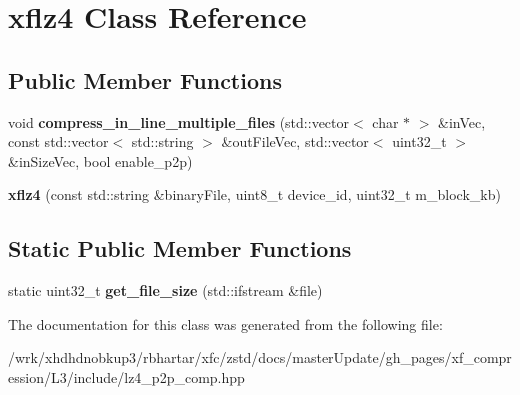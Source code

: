 \hypertarget{classxflz4}{\section{xflz4 Class Reference}
\label{classxflz4}
}
\subsection*{Public Member Functions}
\begin{DoxyCompactItemize}
\item 
\hypertarget{classxflz4_a9e27dafab06458253ea566cc183e5737}{void {\bfseries compress\-\_\-in\-\_\-line\-\_\-multiple\-\_\-files} (std\-::vector$<$ char $\ast$ $>$ \&in\-Vec, const std\-::vector$<$ std\-::string $>$ \&out\-File\-Vec, std\-::vector$<$ uint32\-\_\-t $>$ \&in\-Size\-Vec, bool enable\-\_\-p2p)}\label{classxflz4_a9e27dafab06458253ea566cc183e5737}

\item 
\hypertarget{classxflz4_a3e9f8190e723a3aa1f1316177f338370}{{\bfseries xflz4} (const std\-::string \&binary\-File, uint8\-\_\-t device\-\_\-id, uint32\-\_\-t m\-\_\-block\-\_\-kb)}\label{classxflz4_a3e9f8190e723a3aa1f1316177f338370}

\end{DoxyCompactItemize}
\subsection*{Static Public Member Functions}
\begin{DoxyCompactItemize}
\item 
\hypertarget{classxflz4_a8465dc5a5784b38586c66f78c3791d90}{static uint32\-\_\-t {\bfseries get\-\_\-file\-\_\-size} (std\-::ifstream \&file)}\label{classxflz4_a8465dc5a5784b38586c66f78c3791d90}

\end{DoxyCompactItemize}


The documentation for this class was generated from the following file\-:\begin{DoxyCompactItemize}
\item 
/wrk/xhdhdnobkup3/rbhartar/xfc/zstd/docs/master\-Update/gh\-\_\-pages/xf\-\_\-compression/\-L3/include/lz4\-\_\-p2p\-\_\-comp.\-hpp\end{DoxyCompactItemize}
